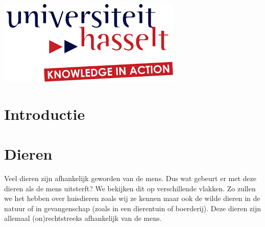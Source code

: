 \begin{titlepage}
\includegraphics{logo.png}\\[1cm] %
 

\vfill %

\end{titlepage}

\tableofcontents
\newpage

\section{Introductie}
\section{Dieren}
Veel dieren zijn afhankelijk geworden van de mens. Dus wat gebeurt er met deze dieren als de mens uitsterft? We bekijken dit op verschillende vlakken. Zo zullen we het hebben over huisdieren zoals wij ze kennen maar ook de wilde dieren in de natuur of in gevangenschap (zoals in een dierentuin of boerderij). Deze dieren zijn allemaal (on)rechtstreeks afhankelijk van de mens.  \cite{ASAPScience,LAPOutbreak}
